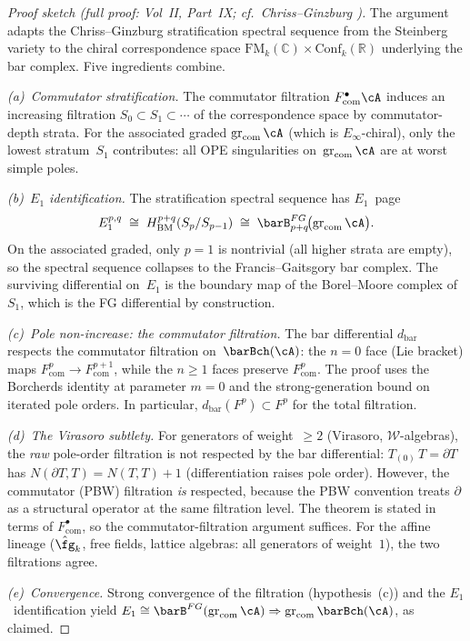 \begin{proof}[Proof sketch \textup{(}full proof:
Vol~\textup{II,} Part~\textup{IX;} cf.\ Chriss--Ginzburg
\cite{CG97}\textup{)}]
The argument adapts the Chriss--Ginzburg stratification spectral
sequence from the Steinberg variety to the chiral correspondence
space $\mathrm{FM}_k(\mathbb{C})\times\mathrm{Conf}_k(\mathbb{R})$
underlying the bar complex. Five ingredients combine.

\smallskip
\emph{(a)~Commutator stratification.}
The commutator filtration $F_{\mathrm{com}}^\bullet \cA$ induces
an increasing filtration $S_0\subset S_1\subset\cdots$ of the
correspondence space by commutator-depth strata. For the
associated graded $\operatorname{gr}_{\mathrm{com}}\cA$ (which is
$E_\infty$-chiral), only the lowest stratum~$S_1$ contributes:
all OPE singularities on~$\operatorname{gr}_{\mathrm{com}}\cA$
are at worst simple poles.

\smallskip
\emph{(b)~$E_1$ identification.}
The stratification spectral sequence has $E_1$~page
\[
E_1^{p,q}
\;\cong\;
H^{p+q}_{\mathrm{BM}}(S_p/S_{p-1})
\;\cong\;
\barB^{FG}_{p+q}\!\bigl(\operatorname{gr}_{\mathrm{com}}\cA\bigr).
\]
On the associated graded, only $p=1$ is nontrivial (all higher strata
are empty), so the spectral sequence collapses to the
Francis--Gaitsgory bar complex. The surviving differential on~$E_1$
is the boundary map of the Borel--Moore complex of~$S_1$, which is
the FG differential by construction.

\smallskip
\emph{(c)~Pole non-increase: the commutator filtration.}
The bar differential $d_{\mathrm{bar}}$ respects the commutator
filtration on~$\barBch(\cA)$: the $n=0$ face (Lie bracket) maps
$F^p_{\mathrm{com}}\to F^{p+1}_{\mathrm{com}}$, while the $n\ge 1$
faces preserve $F^p_{\mathrm{com}}$. The proof uses the Borcherds
identity at parameter $m=0$ and the strong-generation bound on
iterated pole orders. In particular, $d_{\mathrm{bar}}(F^p)\subset F^p$
for the total filtration.

\smallskip
\emph{(d)~The Virasoro subtlety.}
For generators of weight~$\ge 2$ (Virasoro, $\mathcal{W}$-algebras),
the \emph{raw} pole-order filtration is not respected by the bar
differential: $T_{(0)}\,T=\partial T$ has $N(\partial T,T)=N(T,T)+1$
(differentiation raises pole order). However, the commutator (PBW)
filtration \emph{is} respected, because the PBW convention treats
$\partial$ as a structural operator at the same filtration level.
The theorem is stated in terms of $F_{\mathrm{com}}^\bullet$, so the
commutator-filtration argument suffices. For the affine lineage
($\hat\fg_k$, free fields, lattice algebras: all generators of
weight~$1$), the two filtrations agree.

\smallskip
\emph{(e)~Convergence.}
Strong convergence of the filtration (hypothesis~(c)) and the
$E_1$~identification yield
$E_1\cong\barB^{FG}(\operatorname{gr}_{\mathrm{com}}\cA)\Rightarrow
\operatorname{gr}_{\mathrm{com}}\barBch(\cA)$, as claimed.
\end{proof}

